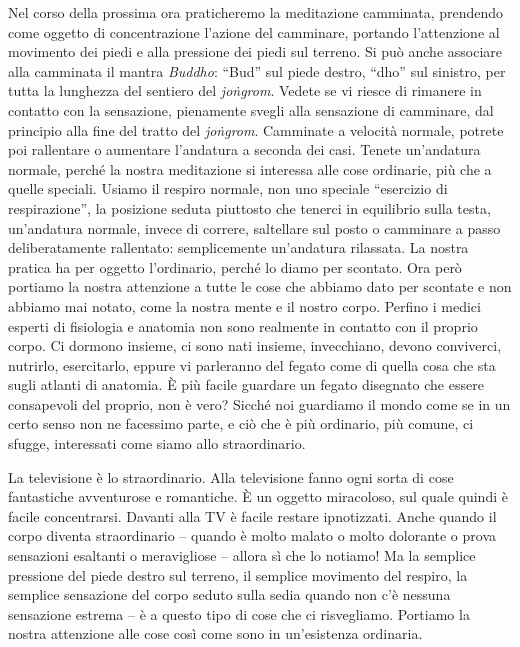 
Nel corso della prossima ora praticheremo la meditazione camminata,
prendendo come oggetto di concentrazione l'azione del camminare,
portando l'attenzione al movimento dei piedi e alla pressione dei piedi
sul terreno. Si può anche associare alla camminata il mantra \textit{Buddho}:
``Bud'' sul piede destro, ``dho'' sul sinistro, per tutta la lunghezza del
sentiero del \textit{joṅgrom}. Vedete se vi riesce di rimanere in contatto con la
sensazione, pienamente svegli alla sensazione di camminare, dal
principio alla fine del tratto del \textit{joṅgrom}. Camminate a velocità
normale, potrete poi rallentare o aumentare l'andatura a seconda dei
casi. Tenete un'andatura normale, perché la nostra meditazione si
interessa alle cose ordinarie, più che a quelle speciali. Usiamo il
respiro normale, non uno speciale ``esercizio di respirazione'', la
posizione seduta piuttosto che tenerci in equilibrio sulla testa,
un'andatura normale, invece di correre, saltellare sul posto o camminare
a passo deliberatamente rallentato: semplicemente un'andatura rilassata.
La nostra pratica ha per oggetto l'ordinario, perché lo diamo per
scontato. Ora però portiamo la nostra attenzione a tutte le cose che
abbiamo dato per scontate e non abbiamo mai notato, come la nostra mente
e il nostro corpo. Perfino i medici esperti di fisiologia e anatomia non
sono realmente in contatto con il proprio corpo. Ci dormono insieme, ci
sono nati insieme, invecchiano, devono conviverci, nutrirlo,
esercitarlo, eppure vi parleranno del fegato come di quella cosa che sta
sugli atlanti di anatomia. È più facile guardare un fegato disegnato
che essere consapevoli del proprio, non è vero? Sicché noi guardiamo il
mondo come se in un certo senso non ne facessimo parte, e ciò che è più
ordinario, più comune, ci sfugge, interessati come siamo allo
straordinario.

La televisione è lo straordinario. Alla televisione fanno ogni sorta di
cose fantastiche avventurose e romantiche. È un oggetto miracoloso, sul
quale quindi è facile concentrarsi. Davanti alla TV è facile restare
ipnotizzati. Anche quando il corpo diventa straordinario – quando è
molto malato o molto dolorante o prova sensazioni esaltanti o
meravigliose – allora sì che lo notiamo! Ma la semplice pressione del
piede destro sul terreno, il semplice movimento del respiro, la semplice
sensazione del corpo seduto sulla sedia quando non c'è nessuna
sensazione estrema – è a questo tipo di cose che ci risvegliamo.
Portiamo la nostra attenzione alle cose così come sono in un'esistenza
ordinaria.

